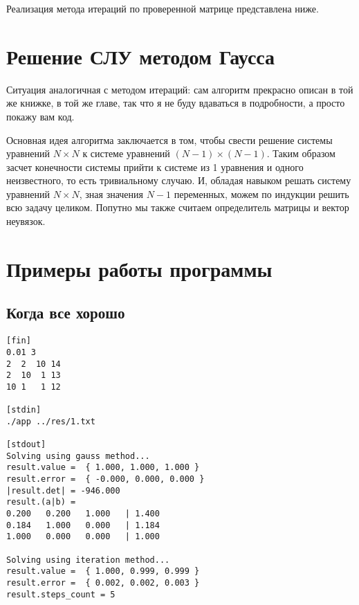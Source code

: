 \documentclass{article}
\begin{document}
Реализация метода итераций по проверенной матрице
представлена ниже.

  

\section{Решение СЛУ методом Гаусса}

Ситуация аналогичная с методом итераций:
сам алгоритм прекрасно описан в той же книжке,
в той же главе, так что я не буду вдаваться в 
подробности, а просто покажу вам код.

  

Основная идея алгоритма заключается в том, чтобы
свести решение системы уравнений $N \times N$ к 
системе уравнений $(N - 1) \times (N - 1)$. Таким
образом засчет конечности системы прийти к
системе из 1 уравнения и одного неизвестного, 
то есть тривиальному случаю. И, обладая навыком
решать систему уравнений $N \times N$, зная значения 
$N - 1$ переменных, можем по индукции решить всю 
задачу целиком. Попутно мы также считаем 
определитель матрицы и вектор неувязок.

\section{Примеры работы программы}

\subsection{Когда все хорошо}
\begin{lstlisting}
[fin]
0.01 3 
2  2  10 14
2  10  1 13
10 1   1 12

[stdin]
./app ../res/1.txt

[stdout]
Solving using gauss method...
result.value =  { 1.000, 1.000, 1.000 }
result.error =  { -0.000, 0.000, 0.000 }
|result.det| = -946.000
result.(a|b) = 
0.200   0.200   1.000   | 1.400
0.184   1.000   0.000   | 1.184
1.000   0.000   0.000   | 1.000

Solving using iteration method...
result.value =  { 1.000, 0.999, 0.999 }
result.error =  { 0.002, 0.002, 0.003 }
result.steps_count = 5

\end{lstlisting}
\end{document}

